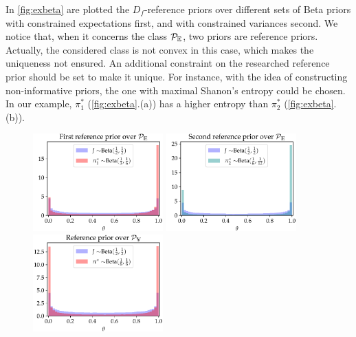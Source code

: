 In \cref{fig:exbeta} are plotted the $D_f$-reference priors over different sets of Beta priors with constrained expectations first, and with constrained variances second. We notice that, when it concerns the class $\mathcal{P}_{\mathbb{E}}$, two priors are reference priors. Actually, the considered class is not convex in this case, which makes the uniqueness not ensured. An additional constraint on the researched reference prior should be set to make it unique. For instance, with the idea of constructing non-informative priors, the one with maximal Shanon's entropy could be chosen. In our example, $\pi_1^\ast$ (\cref{fig:exbeta}.(a)) has a higher entropy than $\pi_2^\ast$ (\cref{fig:exbeta}.(b)).



\begin{figure}
    \centering%
    \includegraphics[width=5cm]{figures/generalized-ref/firstPe.pdf}\hspace*{0.5cm}%
    \includegraphics[width=5cm]{figures/generalized-ref/secondPe.pdf}\hspace*{0.5cm}%
    \includegraphics[width=5cm]{figures/generalized-ref/Pv.pdf}\\
\end{figure}
